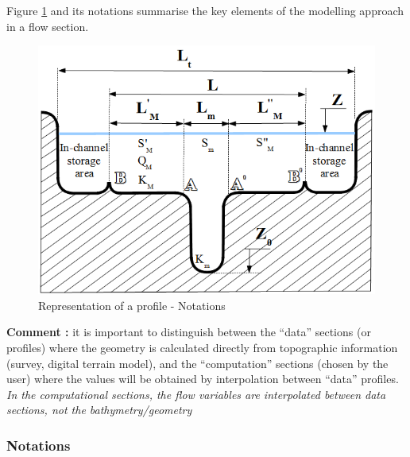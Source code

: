 Figure \ref{SchemProf} and its notations summarise the key elements of the modelling approach in a flow section.

\begin{figure}[h]
 \begin{center}
  \includegraphics[scale=1.5]{Figures/Schema_profil.eps}
  \caption{Representation of a profile - Notations}
  \label{SchemProf}
 \end{center}
\end{figure}

\vspace{0.5cm}

\textbf{Comment :}
it is important to distinguish between the ``data'' sections (or profiles) where the geometry is calculated directly from topographic information (survey, digital terrain model), and the ``computation'' sections (chosen by the user) where the values will be obtained by interpolation between ``data'' profiles.
\textit{In the computational sections, the flow variables are interpolated between data sections, not the bathymetry/geometry}

\subsubsection{Notations} \label{secNot}

